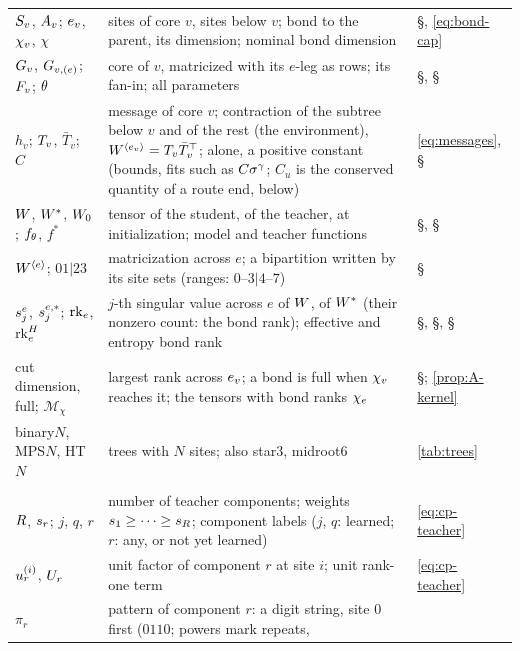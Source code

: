 \begin{xltabular}{\textwidth}{@{}>{\raggedright\arraybackslash}p{3.1cm}X
    >{\raggedright\arraybackslash}p{2.5cm}@{}}
  $S_{v}$, $A_{v}$; $e_{v}$, $\chi_{v}$, $\chi$ & sites of core $v$, sites below $v$; bond to the
    parent, its dimension; nominal bond dimension & \S{}, \eqref{eq:bond-cap} \\
  $G_{v}$, $G_{v,(e)}$; $F_{v}$; $\theta$ & core of $v$, matricized with its $e$-leg as rows; its
    fan-in; all parameters & \S{}, \S{} \\
  $h_v$; $T_{v}$, $\bar T_v$; $C$ & message of core $v$; contraction of the subtree below $v$ and of the rest
    (the environment), $W^{\langle e_{v}\rangle}=T_{v}\bar T_v^{\top}$; alone, a positive constant (bounds, fits such as
    $C\sigma^\gamma$; $C_u$ is the conserved quantity of a route end, below)
    & \eqref{eq:messages}, \S{} \\
  $W$, $W^{*}$, $W_{0}$; $f_\theta$, $f^*$ & tensor of the student, of the teacher, at initialization; model and
    teacher functions & \S{}, \S{} \\
  $W^{\langle e\rangle}$; $01|23$ & matricization across $e$; a bipartition written by its site sets (ranges:
    $0$--$3|4$--$7$) & \S{} \\
  $s^{e}_{j}$, $s^{e,*}_{j}$; $\operatorname{rk}_{e}$, $\operatorname{rk}^{H}_{e}$ & $j$-th singular value across $e$ of $W$, of $W^{*}$
    (their nonzero count: the bond rank); effective and entropy bond rank
    & \S{}, \S{}, \S{} \\
  cut dimension, full; $\mathcal M_\chi$ & largest rank across $e_{v}$; a bond is full when $\chi_{v}$
    reaches it; the tensors with bond ranks $\chi_{e}$ & \S{};
    \cref{prop:A-kernel} \\
  binary$N$, MPS$N$, HT$N$ & trees with $N$ sites; also star3, midroot6 & \cref{tab:trees} \\
  \midrule
   \\
  $R$, $s_{r}$; $j$, $q$, $r$ & number of teacher components; weights $s_{1}\ge\dots\ge s_{R}$;
    component labels ($j$, $q$: learned; $r$: any, or not yet learned) & \eqref{eq:cp-teacher} \\
  $u_{r}^{(i)}$, $U_{r}$ & unit factor of component $r$ at site $i$; unit rank-one term
    & \eqref{eq:cp-teacher} \\
  $\pi_r$ & pattern of component $r$: a digit string, site $0$ first ($0110$; powers mark repeats,

\end{xltabular}

